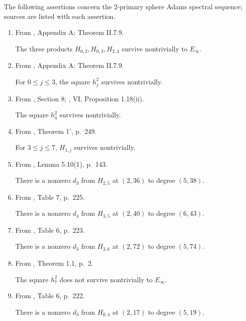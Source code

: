 \begin{theorem}

\label{sem:Literature:two-line-classical-inputs}
The following assertions concern the $2$-primary sphere Adams spectral
sequence; sources are listed with each assertion.
\begin{enumerate}
\item From \cite{MayThesis1964}, Appendix A; Theorem II.7.9.\par

The three products $H_{0,2},H_{0,3},H_{2,4}$ survive nontrivially to $E_\infty$.
\item From \cite{MayThesis1964}, Appendix A; Theorem II.7.9.\par

For $0\leq j\leq3$, the square $h_j^2$ survives nontrivially.
\item From \cite{MahowaldTangora}, Section 8; \cite{BMMS1986}, VI, Proposition 1.18(ii).\par

The square $h_4^2$ survives nontrivially.
\item From \cite{Mahowaldetaj}, Theorem 1', p.~249.\par

For $3\leq j\leq7$, $H_{1,j}$ survives nontrivially.
\item From \cite{IWX}, Lemma 5.10(1), p.~143.\par

There is a nonzero $d_3$ from $H_{2,5}$ at $(2,36)$ to degree $(5,38)$.
\item From \cite{IWX}, Table 7, p.~225.\par

There is a nonzero $d_4$ from $H_{3,5}$ at $(2,40)$ to degree $(6,43)$.
\item From \cite{IWX}, Table 6, p.~223.\par

There is a nonzero $d_3$ from $H_{3,6}$ at $(2,72)$ to degree $(5,74)$.
\item From \cite{HHR}, Theorem 1.1, p.~2.\par

The square $h_7^2$ does not survive nontrivially to $E_\infty$.
\item From \cite{IWX}, Table 6, p.~222.\par

There is a nonzero $d_3$ from $H_{0,4}$ at $(2,17)$ to degree $(5,19)$.
\end{enumerate}



\end{theorem}
